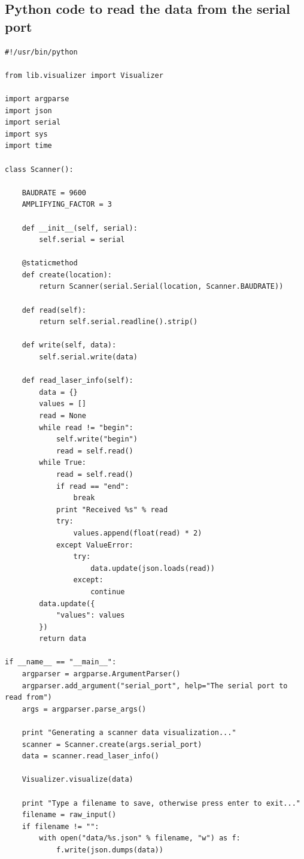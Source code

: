 \documentclass[letterpaper, 12pt]{article}
\begin{document}
\subsection{Python code to read the data from the serial port}
\begin{lstlisting}
#!/usr/bin/python

from lib.visualizer import Visualizer

import argparse
import json
import serial
import sys
import time

class Scanner():

    BAUDRATE = 9600
    AMPLIFYING_FACTOR = 3

    def __init__(self, serial):
        self.serial = serial

    @staticmethod
    def create(location):
        return Scanner(serial.Serial(location, Scanner.BAUDRATE))

    def read(self):
        return self.serial.readline().strip()

    def write(self, data):
        self.serial.write(data)

    def read_laser_info(self):
        data = {}
        values = []
        read = None
        while read != "begin":
            self.write("begin")
            read = self.read()
        while True:
            read = self.read()
            if read == "end":
                break
            print "Received %s" % read
            try:
                values.append(float(read) * 2)
            except ValueError:
                try:
                    data.update(json.loads(read))
                except:
                    continue
        data.update({
            "values": values
        })
        return data

if __name__ == "__main__":
    argparser = argparse.ArgumentParser()
    argparser.add_argument("serial_port", help="The serial port to read from")
    args = argparser.parse_args()

    print "Generating a scanner data visualization..."
    scanner = Scanner.create(args.serial_port)
    data = scanner.read_laser_info()

    Visualizer.visualize(data)

    print "Type a filename to save, otherwise press enter to exit..."
    filename = raw_input()
    if filename != "":
        with open("data/%s.json" % filename, "w") as f:
            f.write(json.dumps(data))
\end{lstlisting}
\end{document}
